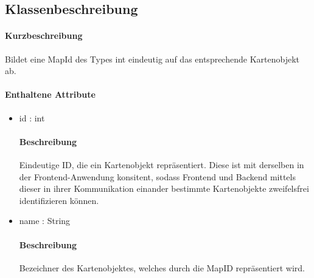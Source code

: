 \subsection{Klassenbeschreibung}%
\paragraph*{Kurzbeschreibung}
    Bildet eine MapId des Types int eindeutig auf das entsprechende Kartenobjekt ab.
\paragraph*{Enthaltene Attribute}
\begin{itemize}
    \item id : int
    	    \paragraph*{Beschreibung}
            Eindeutige ID, die ein Kartenobjekt repräsentiert. Diese ist mit derselben in der Frontend-Anwendung konsitent,
            sodass Frontend und Backend mittels dieser in ihrer Kommunikation einander bestimmte Kartenobjekte zweifelsfrei 
            identifizieren können. 
    \item name : String
            \paragraph{Beschreibung}
            Bezeichner des Kartenobjektes, welches durch die MapID repräsentiert wird.
\end{itemize}            
